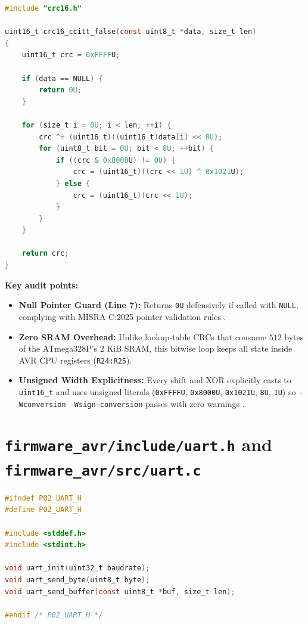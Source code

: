 \documentclass[11pt,a4paper,oneside]{report}
\begin{document}
\begin{lstlisting}[language=C,caption={Bitwise CRC-16 implementation in \texttt{firmware\_avr/src/crc16.c}.}]
#include "crc16.h"

uint16_t crc16_ccitt_false(const uint8_t *data, size_t len)
{
    uint16_t crc = 0xFFFFU;

    if (data == NULL) {
        return 0U;
    }

    for (size_t i = 0U; i < len; ++i) {
        crc ^= (uint16_t)((uint16_t)data[i] << 8U);
        for (uint8_t bit = 0U; bit < 8U; ++bit) {
            if ((crc & 0x8000U) != 0U) {
                crc = (uint16_t)((crc << 1U) ^ 0x1021U);
            } else {
                crc = (uint16_t)(crc << 1U);
            }
        }
    }

    return crc;
}
\end{lstlisting}

\textbf{Key audit points:}
\begin{itemize}
\item \textbf{Null Pointer Guard (Line 7):} Returns \texttt{0U} defensively if called with \texttt{NULL}, complying with MISRA C:2025 pointer validation rules \cite{misra2025}.
\item \textbf{Zero SRAM Overhead:} Unlike lookup-table CRCs that consume $512$ bytes of the ATmega328P's $2\text{ KiB}$ SRAM, this bitwise loop keeps all state inside AVR CPU registers (\texttt{R24:R25}).
\item \textbf{Unsigned Width Explicitness:} Every shift and XOR explicitly casts to \texttt{uint16\_t} and uses unsigned literals (\texttt{0xFFFFU}, \texttt{0x8000U}, \texttt{0x1021U}, \texttt{8U}, \texttt{1U}) so \texttt{-Wconversion -Wsign-conversion} passes with zero warnings \cite{seacord2020}.
\end{itemize}

\section{\texttt{firmware\_avr/include/uart.h} and \texttt{firmware\_avr/src/uart.c}}

\begin{lstlisting}[language=C,caption={Public UART header in \texttt{firmware\_avr/include/uart.h}.}]
#ifndef P02_UART_H
#define P02_UART_H

#include <stddef.h>
#include <stdint.h>

void uart_init(uint32_t baudrate);
void uart_send_byte(uint8_t byte);
void uart_send_buffer(const uint8_t *buf, size_t len);

#endif /* P02_UART_H */
\end{lstlisting}
\end{document}
